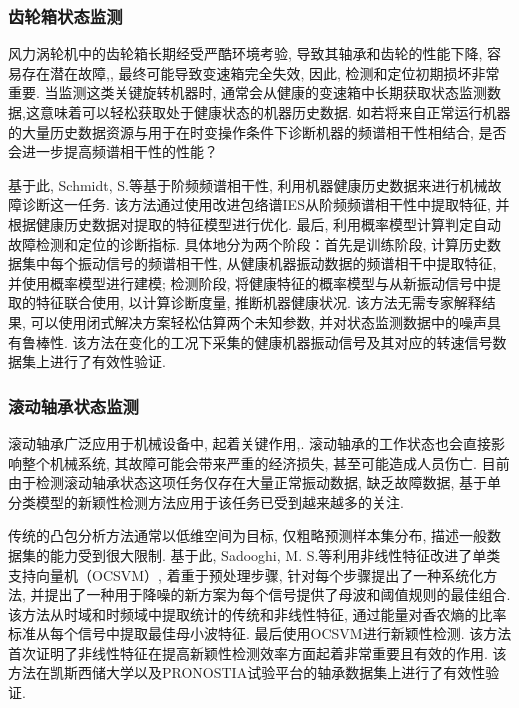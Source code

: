 \documentclass{Style/aas}
\begin{document}
\begin{multicols}{2}
  \subsubsection{齿轮箱状态监测}
  风力涡轮机中的齿轮箱长期经受严酷环境考验, 导致其轴承和齿轮的性能下降, 容易存在潜在故障\cite{salameh2018gearbox},\cite{lin2016fault}, 最终可能导致变速箱完全失效, 因此, 检测和定位初期损坏非常重要. 当监测这类关键旋转机器时, 通常会从健康的变速箱中长期获取状态监测数据,这意味着可以轻松获取处于健康状态的机器历史数据. 如若将来自正常运行机器的大量历史数据资源与用于在时变操作条件下诊断机器的频谱相干性相结合, 是否会进一步提高频谱相干性的性能？

  基于此, Schmidt, S.等\cite{schmidt2020methodology}基于阶频频谱相干性, 利用机器健康历史数据来进行机械故障诊断这一任务. 该方法通过使用改进包络谱IES从阶频频谱相干性中提取特征, 并根据健康历史数据对提取的特征模型进行优化. 最后, 利用概率模型计算判定自动故障检测和定位的诊断指标. 具体地分为两个阶段：首先是训练阶段, 计算历史数据集中每个振动信号的频谱相干性, 从健康机器振动数据的频谱相干中提取特征, 并使用概率模型进行建模; 检测阶段, 将健康特征的概率模型与从新振动信号中提取的特征联合使用, 以计算诊断度量, 推断机器健康状况. 该方法无需专家解释结果, 可以使用闭式解决方案轻松估算两个未知参数, 并对状态监测数据中的噪声具有鲁棒性. 该方法在变化的工况下采集的健康机器振动信号及其对应的转速信号数据集上进行了有效性验证.


  \subsubsection{滚动轴承状态监测}

  滚动轴承广泛应用于机械设备中, 起着关键作用\cite{zeng2019soso},\cite{xin2018semi}. 滚动轴承的工作状态也会直接影响整个机械系统\cite{meng2018enhancement}, 其故障可能会带来严重的经济损失, 甚至可能造成人员伤亡. 目前由于检测滚动轴承状态这项任务仅存在大量正常振动数据\cite{he2020deep}, 缺乏故障数据, 基于单分类模型的新颖性检测方法应用于该任务已受到越来越多的关注.

  传统的凸包分析方法通常以低维空间为目标, 仅粗略预测样本集分布, 描述一般数据集的能力受到很大限制. 基于此, Sadooghi, M. S.等\cite{sadooghi2018improving}利用非线性特征改进了单类支持向量机（OCSVM）, 着重于预处理步骤, 针对每个步骤提出了一种系统化方法, 并提出了一种用于降噪的新方案为每个信号提供了母波和阈值规则的最佳组合. 该方法从时域和时频域中提取统计的传统和非线性特征, 通过能量对香农熵的比率标准从每个信号中提取最佳母小波特征. 最后使用OCSVM进行新颖性检测. 该方法首次证明了非线性特征在提高新颖性检测效率方面起着非常重要且有效的作用. 该方法在凯斯西储大学以及PRONOSTIA试验平台的轴承数据集上进行了有效性验证.


\end{multicols}
\end{document}
